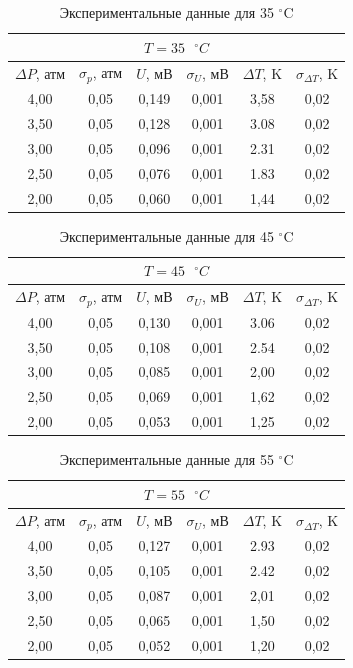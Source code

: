 \documentclass[12pt,a4paper]{article}
\begin{document}
\begin{table}[H]
	\centering
	\begin{tabular}{|c|c|c|c|c|c|}
		\hline
		\multicolumn{6}{|c|}{$ T = 35 \text{ } ^\circ C $} \\ \hline
		$ \Delta P $, атм & $ \sigma_p $, атм & $ U $, мВ & $ \sigma_U $, мВ & $ \Delta T $, K & $ \sigma_{\Delta T} $, K \\ \hline
		4,00 & 0,05 & 0,149 & 0,001 & 3,58 & 0,02 \\ \hline
		3,50 & 0,05 & 0,128 & 0,001 & 3.08 & 0,02 \\ \hline
		3,00 & 0,05 & 0,096 & 0,001 & 2.31 & 0,02 \\ \hline
		2,50 & 0,05 & 0,076 & 0,001 & 1.83 & 0,02 \\ \hline
		2,00 & 0,05 & 0,060 & 0,001 & 1,44 & 0,02 \\ \hline
	\end{tabular}
	\caption{Экспериментальные данные для 35 $^\circ$C}
	\label{tab:30C}
\end{table}

\begin{table}[H]
	\centering
	\begin{tabular}{|c|c|c|c|c|c|}
		\hline
		\multicolumn{6}{|c|}{$ T = 45 \text{ } ^\circ C $} \\ \hline
		$ \Delta P $, атм & $ \sigma_p $, атм & $ U $, мВ & $ \sigma_U $, мВ & $ \Delta T $, K & $ \sigma_{\Delta T} $, K \\ \hline
		4,00 & 0,05 & 0,130 & 0,001 & 3.06 & 0,02 \\ \hline
		3,50 & 0,05 & 0,108 & 0,001 & 2.54 & 0,02 \\ \hline
		3,00 & 0,05 & 0,085 & 0,001 & 2,00 & 0,02 \\ \hline
		2,50 & 0,05 & 0,069 & 0,001 & 1,62 & 0,02 \\ \hline
		2,00 & 0,05 & 0,053 & 0,001 & 1,25 & 0,02 \\ \hline
	\end{tabular}
	\caption{Экспериментальные данные для 45 $^\circ$C}
	\label{tab:30C}
\end{table}

\begin{table}[H]
	\centering
	\begin{tabular}{|c|c|c|c|c|c|}
		\hline
		\multicolumn{6}{|c|}{$ T = 55 \text{ } ^\circ C $} \\ \hline
		$ \Delta P $, атм & $ \sigma_p $, атм & $ U $, мВ & $ \sigma_U $, мВ & $ \Delta T $, K & $ \sigma_{\Delta T} $, K \\ \hline
		4,00 & 0,05 & 0,127 & 0,001 & 2.93 & 0,02 \\ \hline
		3,50 & 0,05 & 0,105 & 0,001 & 2.42 & 0,02 \\ \hline
		3,00 & 0,05 & 0,087 & 0,001 & 2,01 & 0,02 \\ \hline
		2,50 & 0,05 & 0,065 & 0,001 & 1,50 & 0,02 \\ \hline
		2,00 & 0,05 & 0,052 & 0,001 & 1,20 & 0,02 \\ \hline
	\end{tabular}
	\caption{Экспериментальные данные для 55 $^\circ$C}
	\label{tab:30C}
\end{table}
\end{document}
